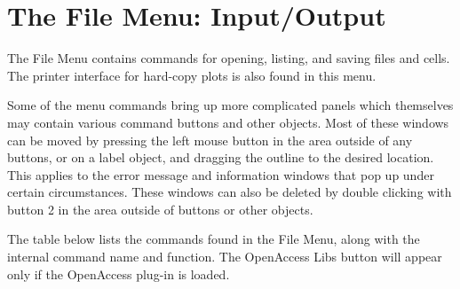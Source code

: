 
\chapter{The File Menu:  {\Xic} Input/Output}
The {\cb File Menu} contains commands for opening, listing, and saving
files and cells.  The printer interface for hard-copy plots is also
found in this menu.

Some of the menu commands bring up more complicated panels which
themselves may contain various command buttons and other objects. 
Most of these windows can be moved by pressing the left mouse button
in the area outside of any buttons, or on a label object, and dragging
the outline to the desired location.  This applies to the error
message and information windows that pop up under certain
circumstances.  These windows can also be deleted by double clicking
with button 2 in the area outside of buttons or other objects.

The table below lists the commands found in the {\cb File Menu}, along
with the internal command name and function.
\ifoa
The {\cb OpenAccess Libs} button will appear only if the OpenAccess
plug-in is loaded.
\fi

